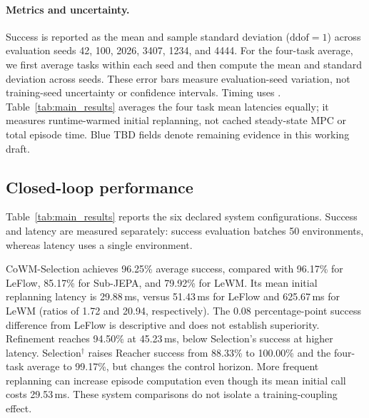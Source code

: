\paragraph{Metrics and uncertainty.}
Success is reported as the mean and sample standard deviation ($\mathrm{ddof}=1$) across evaluation seeds 42, 100, 2026, 3407, 1234, and 4444. For the four-task average, we first average tasks within each seed and then compute the mean and standard deviation across seeds. These error bars measure evaluation-seed variation, not training-seed uncertainty or confidence intervals. Timing uses . Table~\ref{tab:main_results} averages the four task mean latencies equally; it measures runtime-warmed initial replanning, not cached steady-state MPC or total episode time. Blue TBD fields denote remaining evidence in this working draft.

\subsection{Closed-loop performance}
\label{sec:overall}
Table~\ref{tab:main_results} reports the six declared system configurations. Success and latency are measured separately: success evaluation batches 50 environments, whereas latency uses a single environment.
\begin{table}[t]
\centering\scriptsize
\resizebox{\textwidth}{!}{}
\caption{Closed-loop success (\%, mean $\pm$ sample standard deviation across six evaluation seeds, 50 episodes per seed) and mean initial full-replanning latency. One fixed checkpoint is used per method and task. Average success is aggregated within each seed before computing its standard deviation; latency is the equally weighted mean of four task means on an RTX 4090. $\dagger$: only Reacher uses 10/10-step execution/scoring; other task cells reuse Selection. All other rows use 25/25 steps. Refinement is P0-PO-L with two updates. These are declared operating points, not equal-time comparisons.}
\label{tab:main_results}
\end{table}
CoWM-Selection achieves 96.25\% average success, compared with 96.17\% for LeFlow, 85.17\% for Sub-JEPA, and 79.92\% for LeWM. Its mean initial replanning latency is 29.88\,ms, versus 51.43\,ms for LeFlow and 625.67\,ms for LeWM (ratios of 1.72 and 20.94, respectively). The 0.08 percentage-point success difference from LeFlow is descriptive and does not establish superiority. Refinement reaches 94.50\% at 45.23\,ms, below Selection's success at higher latency. Selection$^{\dagger}$ raises Reacher success from 88.33\% to 100.00\% and the four-task average to 99.17\%, but changes the control horizon. More frequent replanning can increase episode computation even though its mean initial call costs 29.53\,ms. These system comparisons do not isolate a training-coupling effect.

